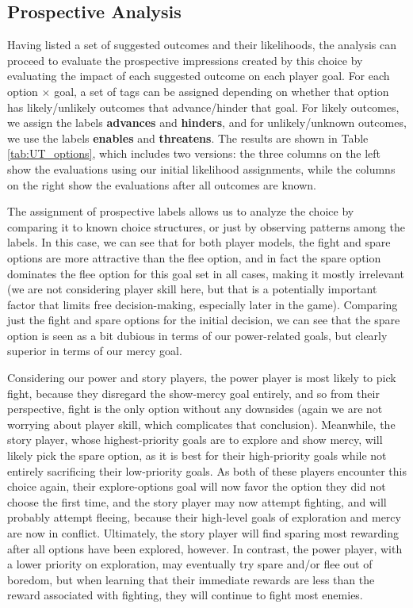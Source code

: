 \documentclass[arts,article,submit,moreauthors,pdftex,10pt,a4paper]{Definitions/mdpi}
\newcommand{\enables}{\textbf{\color{enables}enables}}
\newcommand{\advances}{\textbf{\color{advances}advances}}
\newcommand{\threatens}{\textbf{\color{threatens}threatens}}
\newcommand{\hinders}{\textbf{\color{hinders}hinders}}
\begin{document}
\subsection{Prospective Analysis}

\label{sec:prospective_labels}

Having listed a set of suggested outcomes and their likelihoods, the analysis can proceed to evaluate the prospective impressions created by this choice by evaluating the impact of each suggested outcome on each player goal.
%
For each option $\times$ goal, a set of tags can be assigned depending on whether that option has likely/unlikely outcomes that advance/hinder that goal.
%
For likely outcomes, we assign the labels \advances{} and \hinders{}, and for unlikely/unknown outcomes, we use the labels \enables{} and \threatens{}.
%
The results are shown in Table \ref{tab:UT_options}, which includes two versions: the three columns on the left show the evaluations using our initial likelihood assignments, while the columns on the right show the evaluations after all outcomes are known.


The assignment of prospective labels allows us to analyze the choice by comparing it to known choice structures, or just by observing patterns among the labels.
%
In this case, we can see that for both player models, the fight and spare options are more attractive than the flee option, and in fact the spare option dominates the flee option for this goal set in all cases, making it mostly irrelevant (we are not considering player skill here, but that is a potentially important factor that limits free decision-making, especially later in the game).
%
Comparing just the fight and spare options for the initial decision, we can see that the spare option is seen as a bit dubious in terms of our power-related goals, but clearly superior in terms of our mercy goal.


Considering our power and story players, the power player is most likely to pick fight, because they disregard the show-mercy goal entirely, and so from their  perspective, fight is the only option without any downsides (again we are not worrying about player skill, which complicates that conclusion).
%
Meanwhile, the story player, whose highest-priority goals are to explore and show mercy, will likely pick the spare option, as it is best for their high-priority goals while not entirely sacrificing their low-priority goals.
%
As both of these players encounter this choice again, their explore-options goal will now favor the option they did not choose the first time, and the story player may now attempt fighting, and will probably attempt fleeing, because their high-level goals of exploration and mercy are now in conflict.
%
Ultimately, the story player will find sparing most rewarding after all options have been explored, however.
%
In contrast, the power player, with a lower priority on exploration, may eventually try spare and/or flee out of boredom, but when learning that their immediate rewards are less than the reward associated with fighting, they will continue to fight most enemies.
\end{document}
